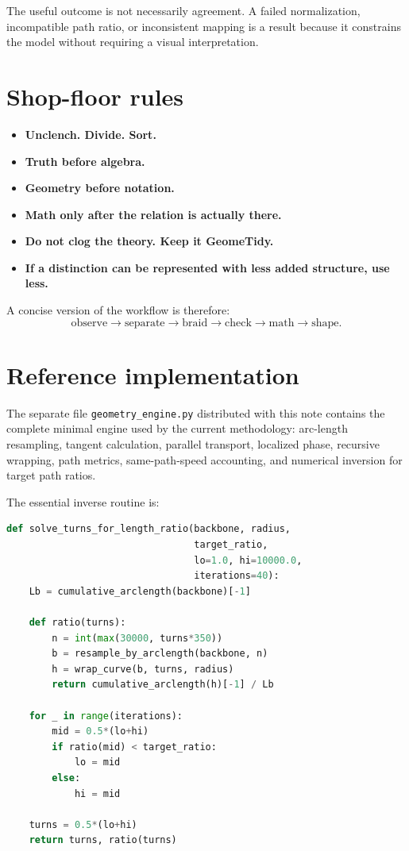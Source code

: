 \documentclass[aps,preprint,onecolumn,nofootinbib]{revtex4-2}
\begin{document}
The useful outcome is not necessarily agreement. A failed normalization, incompatible path ratio, or inconsistent mapping is a result because it constrains the model without requiring a visual interpretation.

\section{Shop-floor rules}

\begin{itemize}
\item \textbf{Unclench. Divide. Sort.}
\item \textbf{Truth before algebra.}
\item \textbf{Geometry before notation.}
\item \textbf{Math only after the relation is actually there.}
\item \textbf{Do not clog the theory. Keep it GeomeTidy.}
\item \textbf{If a distinction can be represented with less added structure, use less.}
\end{itemize}

A concise version of the workflow is therefore:
\begin{equation}
\boxed{\text{observe} \rightarrow \text{separate} \rightarrow \text{braid} \rightarrow \text{check} \rightarrow \text{math} \rightarrow \text{shape}.}
\end{equation}

\appendix
\section{Reference implementation}

The separate file \texttt{geometry\_engine.py} distributed with this note contains the complete minimal engine used by the current methodology: arc-length resampling, tangent calculation, parallel transport, localized phase, recursive wrapping, path metrics, same-path-speed accounting, and numerical inversion for target path ratios.

The essential inverse routine is:

\begin{lstlisting}[language=Python]
def solve_turns_for_length_ratio(backbone, radius,
                                 target_ratio,
                                 lo=1.0, hi=10000.0,
                                 iterations=40):
    Lb = cumulative_arclength(backbone)[-1]

    def ratio(turns):
        n = int(max(30000, turns*350))
        b = resample_by_arclength(backbone, n)
        h = wrap_curve(b, turns, radius)
        return cumulative_arclength(h)[-1] / Lb

    for _ in range(iterations):
        mid = 0.5*(lo+hi)
        if ratio(mid) < target_ratio:
            lo = mid
        else:
            hi = mid

    turns = 0.5*(lo+hi)
    return turns, ratio(turns)
\end{lstlisting}
\end{document}
